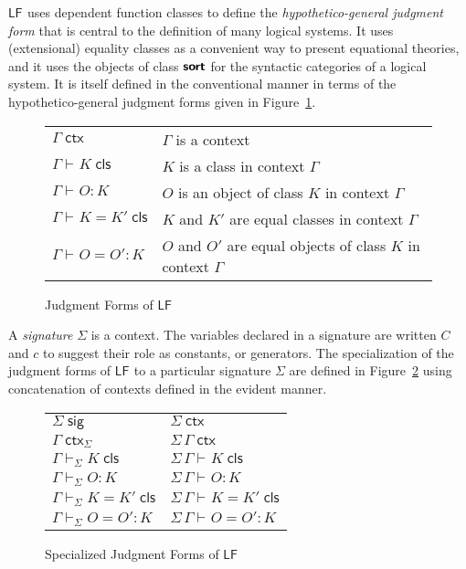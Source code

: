 \documentclass[11pt,twoside]{article}
\newcommand{\LF}[1][]{\ensuremath{\mathsf{LF}_{#1}}}
\newcommand{\sortclass}{\ensuremath{\textbf{\textsf{sort}}}}
\newcommand{\appctx}[2]{{#1}\,{#2}}
\newcommand{\issig}[1]{{#1}\;\mathsf{sig}}
\newcommand{\isctx}[2][]{{#2}\;\mathsf{ctx}_{#1}}
\newcommand{\iscls}[3][]{{#2}\vdash_{#1}{#3}\;\mathsf{cls}}
\newcommand{\eqcls}[4][]{{#2}\vdash_{#1}{#3}={#4}\;\mathsf{cls}}
\newcommand{\isobj}[4][]{{#2}\vdash_{#1}{#3}:{#4}}
\newcommand{\eqobj}[5][]{{#2}\vdash_{#1}{#3}={#4}:{#5}}
\begin{document}
\LF{} uses dependent function classes to define the \emph{hypothetico-general judgment
  form} that is central to the definition of many logical systems.  It uses (extensional)
equality classes as a convenient way to present equational theories, and it uses the
objects of class \sortclass{} for the syntactic categories of a logical system.  It is
itself defined in the conventional manner in terms of the hypothetico-general judgment
forms given in Figure~\ref{fig:lf-judgments}.

\begin{figure}[tp]
  \centering
  \begin{tabular}{l@{\qquad}l}
    $\isctx{\Gamma}$ & $\Gamma$ is a context \\[1ex]
    $\iscls{\Gamma}{K}$ & $K$ is a class in context $\Gamma$ \\
    $\isobj{\Gamma}{O}{K}$ & $O$ is an object of class $K$ in context $\Gamma$ \\[1ex]
    $\eqcls{\Gamma}{K}{K'}$ & $K$ and $K'$ are equal classes in context $\Gamma$ \\
    $\eqobj{\Gamma}{O}{O'}{K}$ & $O$ and $O'$ are equal objects of class $K$ in context $\Gamma$
  \end{tabular}
  \caption{Judgment Forms of \LF{}}
  \label{fig:lf-judgments}
\end{figure}

A \emph{signature} $\Sigma$ is a context.  The variables declared in a signature are written
$C$ and $c$ to suggest their role as constants, or generators.  The specialization of the
judgment forms of \LF{} to a particular signature $\Sigma$ are defined in
Figure~\ref{fig:lf-specialized} using concatenation of contexts defined in the evident
manner.

\begin{figure}[tp]
  \centering
  \begin{tabular}{l@{\qquad\qquad}l}
    $\issig{\Sigma}$             & $\isctx{\Sigma}$ \\[1ex]

    $\isctx[\Sigma]{\Gamma}$           & $\isctx{\appctx{\Sigma}{\Gamma}}$  \\[1ex]
    
    $\iscls[\Sigma]{\Gamma}{K}$           & $\iscls{\appctx{\Sigma}{\Gamma}}{K}$ \\
    $\isobj[\Sigma]{\Gamma}{O}{K}$     & $\isobj{\appctx{\Sigma}{\Gamma}}{O}{K}$ \\[1ex]

    $\eqcls[\Sigma]{\Gamma}{K}{K'}$   & $\eqcls{\appctx{\Sigma}{\Gamma}}{K}{K'}$ \\
    $\eqobj[\Sigma]{\Gamma}{O}{O'}{K}$ & $\eqobj{\appctx{\Sigma}{\Gamma}}{O}{O'}{K}$
  \end{tabular}
  \caption{Specialized Judgment Forms of \LF{}}
  \label{fig:lf-specialized}
\end{figure}
\end{document}
